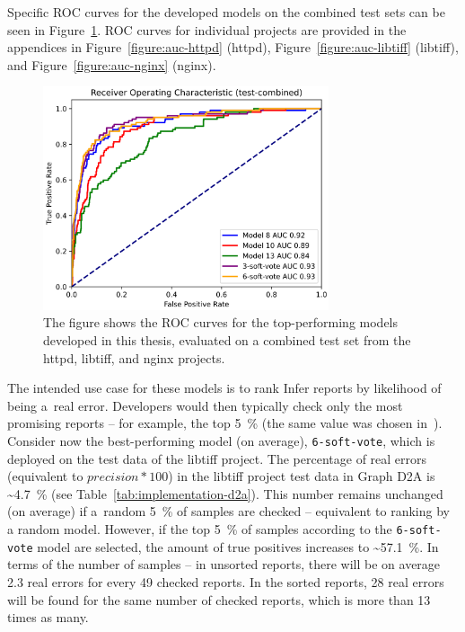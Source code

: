 Specific ROC curves for the developed models on the combined test sets can be seen in Figure~\ref{figure:auc-combined}. ROC curves for individual projects are provided in the appendices in Figure~\ref{figure:auc-httpd} (httpd), Figure~\ref{figure:auc-libtiff} (libtiff), and Figure~\ref{figure:auc-nginx} (nginx).

\begin{figure}[ht]
	\centering
	\includegraphics[width=0.75\textwidth]{figures/auc-combined.png}
	\caption{The figure shows the ROC curves for the top-performing models developed in this thesis, evaluated on a combined test set from the httpd, libtiff, and nginx projects.}
	\label{figure:auc-combined}
\end{figure}

The intended use case for these models is to rank Infer reports by likelihood of being a~real error. Developers would then typically check only the most promising reports -- for example, the top 5~\% (the same value was chosen in~\cite{pujar2024analyzing}). Consider now the best-performing model (on average), \texttt{6-soft-vote}, which is deployed on the test data of the libtiff project. The percentage of real errors (equivalent to $precision * 100$) in the libtiff project test data in Graph D2A is \textasciitilde4.7~\% (see Table~\ref{tab:implementation-d2a}). This number remains unchanged (on average) if a~random 5~\% of samples are checked -- equivalent to ranking by a random model. However, if the top 5~\% of samples according to the \texttt{6-soft-vote} model are selected, the amount of true positives increases to \textasciitilde57.1~\%. In terms of the number of samples -- in unsorted reports, there will be on average 2.3 real errors for every 49 checked reports. In the sorted reports, 28 real errors will be found for the same number of checked reports, which is more than 13 times as many.

